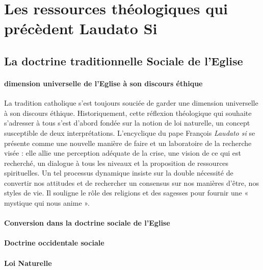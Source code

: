 \section{Les ressources théologiques qui précèdent Laudato Si}


\subsection{La doctrine traditionnelle Sociale de l'Eglise}

\paragraph{dimension universelle de l'Eglise à son discours éthique}
\begin{singlequote}
    La tradition catholique s’est toujours souciée de garder une dimension universelle à son discours éthique. Historiquement, cette réflexion théologique qui souhaite s’adresser à tous s’est d’abord fondée sur la notion de loi naturelle, un concept susceptible de deux interprétations. L’encyclique du pape François\textit{ Laudato si} se présente comme une nouvelle manière de faire et un laboratoire de la recherche visée : elle allie une perception adéquate de la crise, une vision de ce qui est recherché, un dialogue à tous les niveaux et la proposition de ressources spirituelles. Un tel processus dynamique insiste sur la double nécessité de convertir nos attitudes et de rechercher un consensus sur nos manières d’être, nos styles de vie. Il souligne le rôle des religions et des sagesses pour fournir une « mystique qui nous anime ».\cite{thomasset_recherche_2020}
\end{singlequote}

\paragraph{Conversion dans la doctrine sociale de l'Eglise}

\paragraph{Doctrine occidentale sociale}

\paragraph{Loi Naturelle} \cite{thomasset_recherche_2020}


